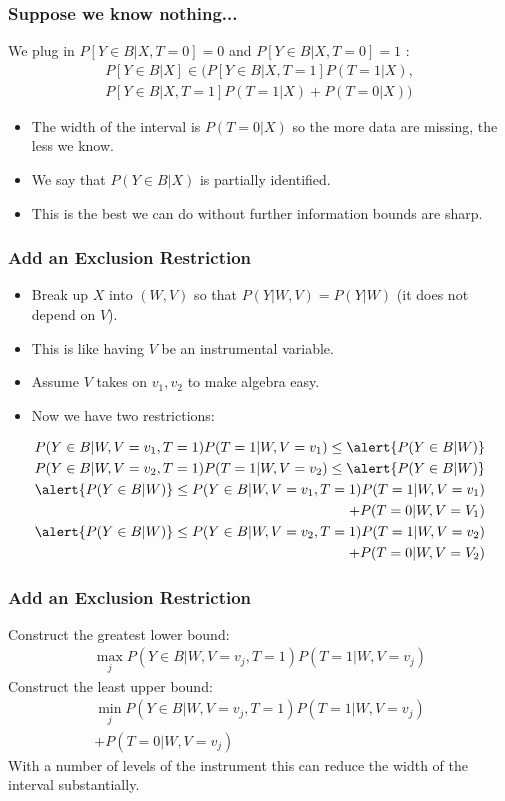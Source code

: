 \documentclass[xcolor=pdftex,dvipsnames,table,mathserif]{beamer}
\begin{document}
\begin{frame}
\frametitle{Suppose we know nothing...}
We plug in \alert{$P[Y \in B | X,T =0] =0$} and \alert{$P[Y \in B | X,T =0] =1$} :
\begin{eqnarray*}
P[Y \in B  | X]   \in ( P[Y \in B | X, T=1] P(T=1 | X),  \\
P[Y \in B | X,T =1] P(T=1 | X) + P(T=0|X)  )
\end{eqnarray*}
\begin{itemize}
\item The width of the interval is $P(T=0| X)$ so the more data are missing, the less we know.
\item We say that $P(Y \in B | X)$ is \alert{partially identified}.
\item This is the best we can do without further information \alert{bounds are sharp}.
\end{itemize}
\end{frame}


\begin{frame}
\frametitle{Add an Exclusion Restriction}
\begin{itemize}
\item Break up $X$ into $(W,V)$ so that $P(Y | W,V) = P(Y | W)$ (it does not depend on $V$).
\item This is like having $V$ be an instrumental variable.
\item Assume $V$ takes on $v_1,v_2$ to make algebra easy.
\item Now we have two restrictions:
\end{itemize}
\begin{eqnarray*}
P(Y \in B | W,V=v_1, T=1) P(T=1 | W, V=v_1) \leq  \alert{P(Y \in B | W)} \\
P(Y \in B | W,V=v_2, T=1) P(T=1 | W, V=v_2) \leq  \alert{P(Y \in B | W)} \\
\alert{P(Y \in B | W)} \leq P(Y \in B | W,V=v_1, T=1) P(T=1 | W, V=v_1) \\
+ P(T=0 | W,V=V_1)  \\
\alert{P(Y \in B | W)} \leq P(Y \in B | W,V=v_2, T=1) P(T=1 | W, V=v_2) \\
+ P(T=0 | W,V=V_2)  \\
\end{eqnarray*}
\end{frame}


\begin{frame}
\frametitle{Add an Exclusion Restriction}
Construct the \alert{greatest lower bound}:
\begin{eqnarray*}
\max_j P(Y \in B | W,V=v_j, T=1) P(T=1 | W, V=v_j) 
\end{eqnarray*}
Construct the \alert{least upper bound}:
\begin{eqnarray*}
\min_j P(Y \in B | W,V=v_j, T=1) P(T=1 | W, V=v_j) \\
 + P(T=0|W,V=v_j)
\end{eqnarray*}
With a number of levels of the instrument this can reduce the width of the interval substantially.
\end{frame}
\end{document}
